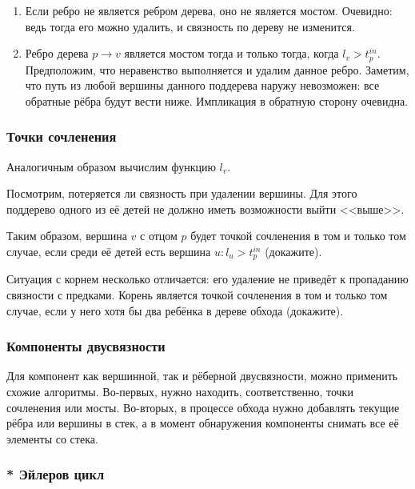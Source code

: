 \documentclass[a4paper,12pt]{article}
\begin{document}
      \begin{enumerate}
        \item Если ребро не является ребром дерева, оно не является
          мостом. Очевидно: ведь тогда его можно удалить, и связность
          по дереву не изменится.
        \item Ребро дерева $p \to v$ является мостом тогда и только
          тогда, когда $l_v > t^{in}_p$. Предположим, что неравенство
          выполняется и удалим данное ребро. Заметим, что путь из
          любой вершины данного поддерева наружу невозможен: все
          обратные рёбра будут вести ниже. Импликация в обратную
          сторону очевидна.
      \end{enumerate}

      \subsubsection{Точки сочленения}

      Аналогичным образом вычислим функцию $l_v$.

      Посмотрим, потеряется ли связность при удалении вершины. Для этого
      поддерево одного из её детей не должно иметь возможности выйти
      <<выше>>.

      Таким образом, вершина $v$ с отцом $p$ будет точкой сочленения
      в том и только том случае, если среди её детей есть вершина
      $u: l_u > t^{in}_p$ (докажите).

      Ситуация с корнем несколько отличается: его удаление не приведёт
      к пропаданию связности с предками. Корень является точкой сочленения
      в том и только том случае, если у него хотя бы два ребёнка в дереве
      обхода (докажите).

      \subsubsection{Компоненты двусвязности}

      Для компонент как вершинной, так и рёберной двусвязности, можно
      применить схожие алгоритмы. Во-первых, нужно находить, соответственно,
      точки сочленения или мосты. Во-вторых, в процессе обхода нужно
      добавлять текущие рёбра или вершины в стек, а в момент обнаружения
      компоненты снимать все её элементы со стека.

      \subsubsection{* Эйлеров цикл}
\end{document}
